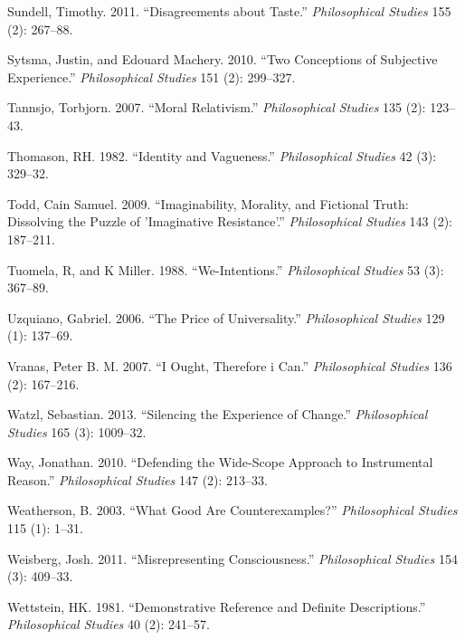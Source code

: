 \documentclass[
  10pt,
  letterpaper,
  DIV=11,
  numbers=noendperiod,
  twoside]{scrartcl}
\newlength{\cslhangindent}
\newenvironment{CSLReferences}[2] %
 {\begin{list}{}{%
  \setlength{\itemindent}{0pt}
  \setlength{\leftmargin}{0pt}
  \setlength{\parsep}{0pt}
  \ifodd #1
   \setlength{\leftmargin}{\cslhangindent}
   \setlength{\itemindent}{-1\cslhangindent}
  \fi
  \setlength{\itemsep}{#2\baselineskip}}}
 {\end{list}}
\begin{document}
\begin{CSLReferences}{1}{0}
Sundell, Timothy. 2011. {``Disagreements about Taste.''}
\emph{Philosophical Studies} 155 (2): 267--88.

Sytsma, Justin, and Edouard Machery. 2010. {``Two Conceptions of
Subjective Experience.''} \emph{Philosophical Studies} 151 (2):
299--327.

Tannsjo, Torbjorn. 2007. {``Moral Relativism.''} \emph{Philosophical
Studies} 135 (2): 123--43.

Thomason, RH. 1982. {``Identity and Vagueness.''} \emph{Philosophical
Studies} 42 (3): 329--32.

Todd, Cain Samuel. 2009. {``Imaginability, Morality, and Fictional
Truth: Dissolving the Puzzle of 'Imaginative Resistance'.''}
\emph{Philosophical Studies} 143 (2): 187--211.

Tuomela, R, and K Miller. 1988. {``We-Intentions.''} \emph{Philosophical
Studies} 53 (3): 367--89.

Uzquiano, Gabriel. 2006. {``The Price of Universality.''}
\emph{Philosophical Studies} 129 (1): 137--69.

Vranas, Peter B. M. 2007. {``I Ought, Therefore i Can.''}
\emph{Philosophical Studies} 136 (2): 167--216.

Watzl, Sebastian. 2013. {``Silencing the Experience of Change.''}
\emph{Philosophical Studies} 165 (3): 1009--32.

Way, Jonathan. 2010. {``Defending the Wide-Scope Approach to
Instrumental Reason.''} \emph{Philosophical Studies} 147 (2): 213--33.

Weatherson, B. 2003. {``What Good Are Counterexamples?''}
\emph{Philosophical Studies} 115 (1): 1--31.

Weisberg, Josh. 2011. {``Misrepresenting Consciousness.''}
\emph{Philosophical Studies} 154 (3): 409--33.

Wettstein, HK. 1981. {``Demonstrative Reference and Definite
Descriptions.''} \emph{Philosophical Studies} 40 (2): 241--57.


\end{CSLReferences}
\end{document}
